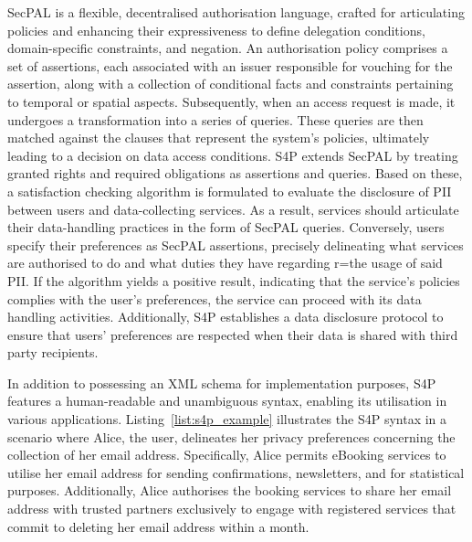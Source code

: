 SecPAL \citep{becker_design_2007} is a flexible, decentralised authorisation language, crafted for articulating policies and enhancing their expressiveness to define delegation conditions, domain-specific constraints, and negation.
An authorisation policy comprises a set of assertions, each associated with an issuer responsible for vouching for the assertion, along with a collection of conditional facts and constraints pertaining to temporal or spatial aspects.
Subsequently, when an access request is made, it undergoes a transformation into a series of queries.
These queries are then matched against the clauses that represent the system's policies, ultimately leading to a decision on data access conditions.
S4P extends SecPAL by treating granted rights and required obligations as assertions and queries.
Based on these, a satisfaction checking algorithm is formulated to evaluate the disclosure of PII between users and data-collecting services.
As a result, services should articulate their data-handling practices in the form of SecPAL queries.
Conversely, users specify their preferences as SecPAL assertions, precisely delineating what services are authorised to do and what duties they have regarding r=the usage of said PII.
If the algorithm yields a positive result, indicating that the service's policies complies with the user's preferences, the service can proceed with its data handling activities.
Additionally, S4P establishes a data disclosure protocol to ensure that users' preferences are respected when their data is shared with third party recipients.

In addition to possessing an XML schema for implementation purposes, S4P features a human-readable and unambiguous syntax, enabling its utilisation in various applications. 
Listing~\ref{list:s4p_example} illustrates the S4P syntax in a scenario where Alice, the user, delineates her privacy preferences concerning the collection of her email address. 
Specifically, Alice permits eBooking services to utilise her email address for sending confirmations, newsletters, and for statistical purposes.
Additionally, Alice authorises the booking services to share her email address with trusted partners exclusively to engage with registered services that commit to deleting her email address within a month.

